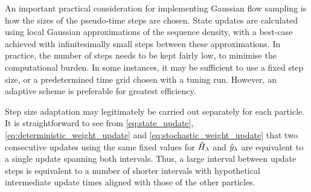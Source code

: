 \documentclass{article}
\begin{document}
An important practical consideration for implementing Gaussian flow sampling is how the sizes of the pseudo-time steps are chosen. State updates are calculated using local Gaussian approximations of the sequence density, with a best-case achieved with infinitesimally small steps between these approximations. In practice, the number of steps needs to be kept fairly low, to minimise the computational burden. In some instances, it may be sufficient to use a fixed step size, or a predetermined time grid chosen with a tuning run. However, an adaptive scheme is preferable for greatest efficiency.

Step size adaptation may legitimately be carried out separately for each particle. It is straightforward to see from \eqref{eq:state_update}, \eqref{eq:deterministic_weight_update} and \eqref{eq:stochastic_weight_update} that two consecutive updates using the same fixed values for $\hat{H}_{\lambda}$ and $\hat{y}_{\lambda}$ are equivalent to a single update spanning both intervals. Thus, a large interval between update steps is equivalent to a number of shorter intervals with hypothetical intermediate update times aligned with those of the other particles.
\end{document}
